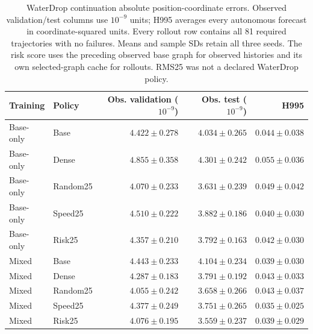 \begin{table}[!ht]
\centering\small
\setlength{\tabcolsep}{5pt}\renewcommand{\arraystretch}{1.12}
\caption{WaterDrop continuation absolute position-coordinate errors. Observed validation/test columns use $10^{-9}$ units; H995 averages every autonomous forecast in coordinate-squared units. Every rollout row contains all 81 required trajectories with no failures. Means and sample SDs retain all three seeds. The risk score uses the preceding observed base graph for observed histories and its own selected-graph cache for rollouts. RMS25 was not a declared WaterDrop policy.}
\label{tab:waterdrop110k-observed}
\label{tab:waterdrop110k-rollout}
\begin{tabular}{llrrr}
\toprule
Training & Policy & Obs. validation ($10^{-9}$) & Obs. test ($10^{-9}$) & H995\\
\midrule
Base-only & Base & $4.422\pm0.278$ & $4.034\pm0.265$ & $0.044\pm0.038$\\
Base-only & Dense & $4.855\pm0.358$ & $4.301\pm0.242$ & $0.055\pm0.036$\\
Base-only & Random25 & $4.070\pm0.233$ & $3.631\pm0.239$ & $0.049\pm0.042$\\
Base-only & Speed25 & $4.510\pm0.222$ & $3.882\pm0.186$ & $0.040\pm0.030$\\
Base-only & Risk25 & $4.357\pm0.210$ & $3.792\pm0.163$ & $0.042\pm0.030$\\
Mixed & Base & $4.443\pm0.233$ & $4.104\pm0.234$ & $0.039\pm0.030$\\
Mixed & Dense & $4.287\pm0.183$ & $3.791\pm0.192$ & $0.043\pm0.033$\\
Mixed & Random25 & $4.055\pm0.242$ & $3.658\pm0.266$ & $0.043\pm0.037$\\
Mixed & Speed25 & $4.377\pm0.249$ & $3.751\pm0.265$ & $0.035\pm0.025$\\
Mixed & Risk25 & $4.076\pm0.195$ & $3.559\pm0.237$ & $0.039\pm0.029$\\
\bottomrule
\end{tabular}
\end{table}

